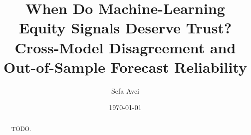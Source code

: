 \documentclass[12pt]{article}
\title{When Do Machine-Learning Equity Signals Deserve Trust?\\
Cross-Model Disagreement and Out-of-Sample Forecast Reliability}
\author{Sefa Avci}
\date{\today}
\begin{document}
\maketitle

\begin{abstract}
TODO.
\end{abstract}











\nocite{*}


\end{document}
